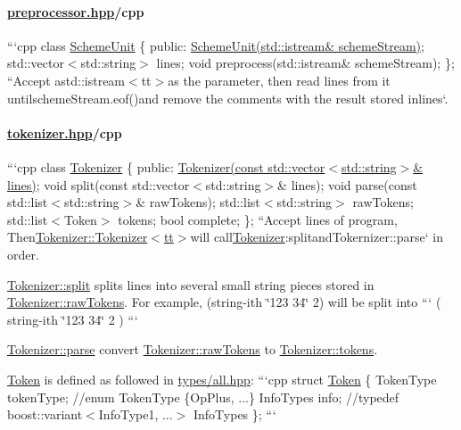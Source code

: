 \paragraph*{\hyperlink{preprocessor_8hpp}{preprocessor.\+hpp}/cpp}

```cpp class \hyperlink{class_scheme_unit}{Scheme\+Unit} \{ public\+: \hyperlink{class_scheme_unit}{Scheme\+Unit(std\+::istream\& scheme\+Stream)}; std\+::vector$<$std\+::string$>$ lines; void preprocess(std\+::istream\& scheme\+Stream); \}; ``{\ttfamily  Accept a}std\+::istream$<$tt$>$as the parameter, then read lines from it untilscheme\+Stream.\+eof(){\ttfamily and remove the comments with the result stored in}lines`.

\paragraph*{\hyperlink{tokenizer_8hpp}{tokenizer.\+hpp}/cpp}

```cpp class \hyperlink{class_tokenizer}{Tokenizer} \{ public\+: \hyperlink{class_tokenizer}{Tokenizer(const std\+::vector$<$std\+::string$>$\& lines)}; void split(const std\+::vector$<$std\+::string$>$\& lines); void parse(const std\+::list$<$std\+::string$>$\& raw\+Tokens); std\+::list$<$std\+::string$>$ raw\+Tokens; std\+::list$<$\+Token$>$ tokens; bool complete; \}; ``{\ttfamily  Accept lines of program, Then}\hyperlink{class_tokenizer_a2a6c04ea8c784f66bebcb6df7073769c}{Tokenizer\+::\+Tokenizer$<$tt$>$}will call\hyperlink{class_tokenizer}{Tokenizer}\+:split{\ttfamily and}Tokernizer\+::parse` in order.

{\ttfamily \hyperlink{class_tokenizer_a8bd8a4eb5df764f6128028daa0e9044b}{Tokenizer\+::split}} splits {\ttfamily lines} into several small string pieces stored in {\ttfamily \hyperlink{class_tokenizer_a89707ad3a758fc9ec58f00d92d5fc622}{Tokenizer\+::raw\+Tokens}}. For example, {\ttfamily (string-\/ith \char`\"{}123 34\char`\"{} 2)} will be split into ``` ( string-\/ith \char`\"{}123 34\char`\"{} 2 ) ```

{\ttfamily \hyperlink{class_tokenizer_ae928efe72c00908a3529747b4cfd01d5}{Tokenizer\+::parse}} convert {\ttfamily \hyperlink{class_tokenizer_a89707ad3a758fc9ec58f00d92d5fc622}{Tokenizer\+::raw\+Tokens}} to {\ttfamily \hyperlink{class_tokenizer_ae547093dbd03b3e70373147e4669d9fa}{Tokenizer\+::tokens}}.

{\ttfamily \hyperlink{struct_token}{Token}} is defined as followed in {\ttfamily \hyperlink{types_2all_8hpp}{types/all.\+hpp}}\+: ```cpp struct \hyperlink{struct_token}{Token} \{ Token\+Type token\+Type; //enum Token\+Type \{Op\+Plus, ...\} Info\+Types info; //typedef boost\+::variant$<$\+Info\+Type1, ...$>$ Info\+Types \}; ```

